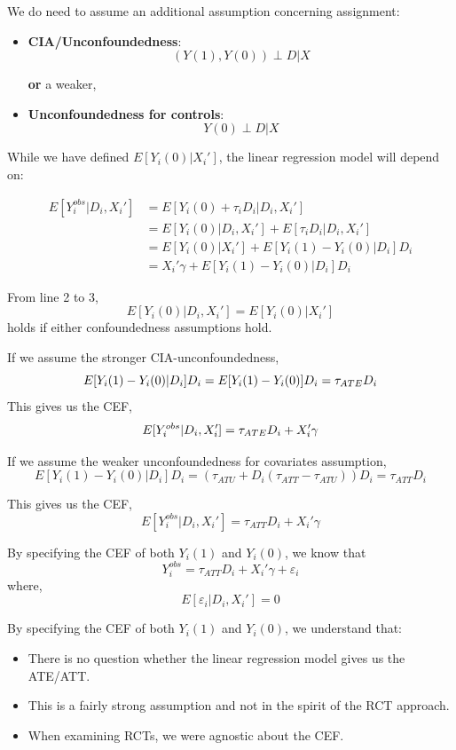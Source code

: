 \documentclass[
  letterpaper,
  DIV=11,
  numbers=noendperiod]{scrreprt}
\providecommand{\tightlist}{%
  \setlength{\itemsep}{0pt}\setlength{\parskip}{0pt}}\usepackage{longtable,booktabs,array}
\theoremstyle{definition}
\theoremstyle{remark}
\begin{document}
We do need to assume an additional assumption concerning assignment:

\begin{itemize}
\item
  \textbf{CIA/Unconfoundedness}: \[
  (Y(1),Y(0)) \perp D | X
  \]

  \textbf{or} a weaker,
\item
  \textbf{Unconfoundedness for controls}: \[
  Y(0) \perp D | X
  \]
\end{itemize}

While we have defined \(E[Y_i(0)|X_i']\), the linear regression model
will depend on:

\[
\begin{aligned}
E[Y^{obs}_i|D_i,X_i'] &= E[Y_i(0)+\tau_iD_i|D_i,X_i'] \\
                      &= E[Y_i(0)|D_i,X_i']+E[\tau_iD_i|D_i,X_i'] \\
                      &= E[Y_i(0)|X_i']+E[Y_i(1)-Y_i(0)|D_i]D_i \\
                      &= X_i'\gamma + E[Y_i(1)-Y_i(0)|D_i]D_i
\end{aligned}
\]

From line 2 to 3, \[
E[Y_i(0)|D_i,X_i'] = E[Y_i(0)|X_i']
\] holds if either confoundedness assumptions hold.

If we assume the stronger CIA-unconfoundedness, \[
E[Y_i(1)-Y_i(0)|D_i]D_i = E[Y_i(1)-Y_i(0)]D_i = \tau_{\scriptsize{ATE}}D_i
\] This gives us the CEF, \[
E[Y^{obs}_i|D_i,X_i'] = \tau_{\scriptsize{ATE}}D_i + X_i'\gamma
\]

If we assume the weaker unconfoundedness for covariates assumption, \[
E[Y_i(1)-Y_i(0)|D_i]D_i = \left(\tau_{ATU} + D_i(\tau_{ATT}-\tau_{ATU})\right)D_i = \tau_{ATT}D_i
\]

This gives us the CEF, \[
E[Y^{obs}_i|D_i,X_i'] = \tau_{ATT}D_i + X_i'\gamma
\]

By specifying the CEF of both \(Y_i(1)\) and \(Y_i(0)\), we know that \[
Y^{obs}_i = \tau_{ATT}D_i + X_i'\gamma + \varepsilon_i
\] where, \[
E[\varepsilon_i|D_i,X_i'] = 0
\]

By specifying the CEF of both \(Y_i(1)\) and \(Y_i(0)\), we understand
that:

\begin{itemize}
\tightlist
\item
  There is no question whether the linear regression model gives us the
  ATE/ATT.
\item
  This is a fairly strong assumption and not in the spirit of the RCT
  approach.
\item
  When examining RCTs, we were agnostic about the CEF.
\end{itemize}
\end{document}
